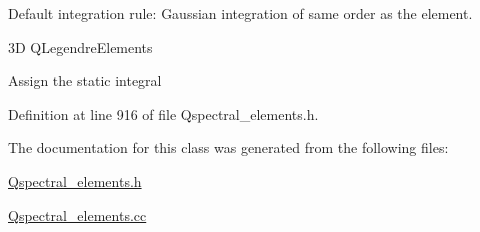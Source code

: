 Default integration rule\+: Gaussian integration of same \textquotesingle{}order\textquotesingle{} as the element. 

3D Q\+Legendre\+Elements

Assign the static integral 

Definition at line 916 of file Qspectral\+\_\+elements.\+h.



The documentation for this class was generated from the following files\+:\begin{DoxyCompactItemize}
\item 
\hyperlink{Qspectral__elements_8h}{Qspectral\+\_\+elements.\+h}\item 
\hyperlink{Qspectral__elements_8cc}{Qspectral\+\_\+elements.\+cc}\end{DoxyCompactItemize}

